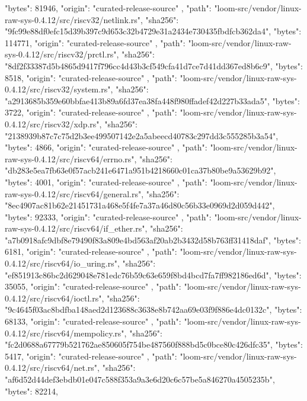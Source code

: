 {{      "bytes": 81946,
      "origin": "curated-release-source"
    },
    {
      "path": "loom-src/vendor/linux-raw-sys-0.4.12/src/riscv32/netlink.rs",
      "sha256": "9fc99e88df0efc15d39b397c9d653c32b4729e31a2434e730435fbdfcb362da4",
      "bytes": 114771,
      "origin": "curated-release-source"
    },
    {
      "path": "loom-src/vendor/linux-raw-sys-0.4.12/src/riscv32/prctl.rs",
      "sha256": "8df2f33387d5b4865d9417f796cc4d43b3cf549cfa41d7ce7d41dd367ed8b6c9",
      "bytes": 8518,
      "origin": "curated-release-source"
    },
    {
      "path": "loom-src/vendor/linux-raw-sys-0.4.12/src/riscv32/system.rs",
      "sha256": "a2913685b359e60bbfae413b89a6fd37ea38fa448f980ffadef42d227b33ada5",
      "bytes": 3722,
      "origin": "curated-release-source"
    },
    {
      "path": "loom-src/vendor/linux-raw-sys-0.4.12/src/riscv32/xdp.rs",
      "sha256": "2138939b87c7c75d2b3ee499507142e2a5abeecd40783c297dd3c555285b3a54",
      "bytes": 4866,
      "origin": "curated-release-source"
    },
    {
      "path": "loom-src/vendor/linux-raw-sys-0.4.12/src/riscv64/errno.rs",
      "sha256": "db283e5ea7fb63e0f57acb241e6471a951b4218660c01ca37b80be9a53629b92",
      "bytes": 4001,
      "origin": "curated-release-source"
    },
    {
      "path": "loom-src/vendor/linux-raw-sys-0.4.12/src/riscv64/general.rs",
      "sha256": "8ec4907ac81b62e21451731a468e5f4fe7a37a46d80c56b33e0969d2d059d442",
      "bytes": 92333,
      "origin": "curated-release-source"
    },
    {
      "path": "loom-src/vendor/linux-raw-sys-0.4.12/src/riscv64/if_ether.rs",
      "sha256": "a7b0918afc9dbf8e79490f83a809e4bd563af20ab2b3432d58b763ff31418daf",
      "bytes": 6181,
      "origin": "curated-release-source"
    },
    {
      "path": "loom-src/vendor/linux-raw-sys-0.4.12/src/riscv64/io_uring.rs",
      "sha256": "ef851913c86bc2d629048e781edc76b59c63e659f8bd4bcd7fa7ff982186ed6d",
      "bytes": 35055,
      "origin": "curated-release-source"
    },
    {
      "path": "loom-src/vendor/linux-raw-sys-0.4.12/src/riscv64/ioctl.rs",
      "sha256": "9c4645f03ac8bdfba148aed2d123688c3638e8b742aa69e03f9f886e4dc0132c",
      "bytes": 68133,
      "origin": "curated-release-source"
    },
    {
      "path": "loom-src/vendor/linux-raw-sys-0.4.12/src/riscv64/mempolicy.rs",
      "sha256": "fc2d0688a67779b521762ae850605f754be487560f888bd5c0bce80c426dfc35",
      "bytes": 5417,
      "origin": "curated-release-source"
    },
    {
      "path": "loom-src/vendor/linux-raw-sys-0.4.12/src/riscv64/net.rs",
      "sha256": "af6d52d44def3ebdb01e047c588f353a9a3e6d20c6c57be5a846270a4505235b",
      "bytes": 82214,
}}
